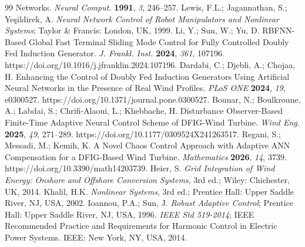 \documentclass[11pt,a4paper]{article}
\begin{document}
\begin{thebibliography}{99}
Networks. \emph{Neural Comput.} \textbf{1991}, \emph{3}, 246--257.
 Lewis, F.L.; Jagannathan, S.; Ye\c{s}ildirek, A. \emph{Neural Network Control of
Robot Manipulators and Nonlinear Systems}; Taylor \& Francis: London, UK, 1999.
 Li, Y.; Sun, W.; Yu, D. RBFNN-Based Global Fast Terminal Sliding Mode Control for Fully
Controlled Doubly Fed Induction Generator. \emph{J. Frankl. Inst.} \textbf{2024}, \emph{361}, 107196.
https://doi.org/10.1016/j.jfranklin.2024.107196.
 Dardabi, C.; Djebli, A.; Chojaa, H. Enhancing the Control of Doubly Fed Induction
Generators Using Artificial Neural Networks in the Presence of Real Wind Profiles. \emph{PLoS ONE}
\textbf{2024}, \emph{19}, e0300527. https://doi.org/10.1371/journal.pone.0300527.
 Bounar, N.; Boulkroune, A.; Labdai, S.; Chrifi-Alaoui, L.; Khebbache, H.
Disturbance Observer-Based Finite-Time Adaptive Neural Control Scheme of DFIG-Wind Turbine. \emph{Wind
Eng.} \textbf{2025}, \emph{49}, 271--289. https://doi.org/10.1177/0309524X241263517.
 Regani, S.; Messadi, M.; Kemih, K. A Novel Chaos Control Approach with Adaptive ANN
Compensation for a DFIG-Based Wind Turbine. \emph{Mathematics} \textbf{2026}, \emph{14}, 3739.
https://doi.org/10.3390/math14203739.
 Heier, S. \emph{Grid Integration of Wind Energy: Onshore and Offshore Conversion
Systems}, 3rd ed.; Wiley: Chichester, UK, 2014.
 Khalil, H.K. \emph{Nonlinear Systems}, 3rd ed.; Prentice Hall: Upper Saddle River,
NJ, USA, 2002.
 Ioannou, P.A.; Sun, J. \emph{Robust Adaptive Control}; Prentice Hall: Upper Saddle
River, NJ, USA, 1996.
 \emph{IEEE Std 519-2014}; IEEE Recommended Practice and Requirements for Harmonic
Control in Electric Power Systems. IEEE: New York, NY, USA, 2014.
\end{thebibliography}
\end{document}
